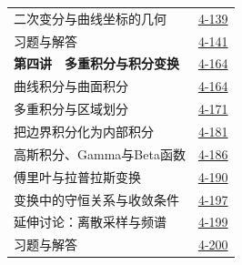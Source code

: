 \begin{longtable}{@{}p{}r@{}}
\hspace{1em}二次变分与曲线坐标的几何&\href{course-page:4:141}{4-139}\\[2pt]
\hspace{1em}习题与解答&\href{course-page:4:143}{4-141}\\[2pt]
\textbf{第四讲　多重积分与积分变换}&\href{course-page:4:166}{4-164}\\[2pt]
\hspace{1em}曲线积分与曲面积分&\href{course-page:4:166}{4-164}\\[2pt]
\hspace{1em}多重积分与区域划分&\href{course-page:4:173}{4-171}\\[2pt]
\hspace{1em}把边界积分化为内部积分&\href{course-page:4:183}{4-181}\\[2pt]
\hspace{1em}高斯积分、Gamma与Beta函数&\href{course-page:4:188}{4-186}\\[2pt]
\hspace{1em}傅里叶与拉普拉斯变换&\href{course-page:4:192}{4-190}\\[2pt]
\hspace{1em}变换中的守恒关系与收敛条件&\href{course-page:4:199}{4-197}\\[2pt]
\hspace{1em}延伸讨论：离散采样与频谱&\href{course-page:4:201}{4-199}\\[2pt]
\hspace{1em}习题与解答&\href{course-page:4:202}{4-200}\\[2pt]
\end{longtable}

